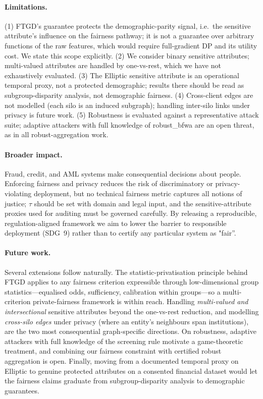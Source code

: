 \paragraph{Limitations.}
(1) FTGD's guarantee protects the demographic-parity signal, i.e.\ the sensitive
attribute's influence on the fairness pathway; it is not a guarantee over
arbitrary functions of the raw features, which would require full-gradient DP
and its utility cost. We state this scope explicitly. (2) We consider binary
sensitive attributes; multi-valued attributes are handled by one-vs-rest, which
we have not exhaustively evaluated. (3) The Elliptic sensitive attribute is an
operational temporal proxy, not a protected demographic; results there should be
read as subgroup-disparity analysis, not demographic fairness. (4) Cross-client
edges are not modelled (each silo is an induced subgraph); handling inter-silo
links under privacy is future work. (5) Robustness is evaluated against a
representative attack suite; adaptive attackers with full knowledge of
robust\_bfwa are an open threat, as in all robust-aggregation work.

\paragraph{Broader impact.}
Fraud, credit, and AML systems make consequential decisions about people.
Enforcing fairness and privacy reduces the risk of discriminatory or
privacy-violating deployment, but no technical fairness metric captures all
notions of justice; $\tau$ should be set with domain and legal input, and the
sensitive-attribute proxies used for auditing must be governed carefully. By
releasing a reproducible, regulation-aligned framework we aim to lower the
barrier to responsible deployment (SDG~9) rather than to certify any particular
system as "fair''.

\paragraph{Future work.}
Several extensions follow naturally. The statistic-privatisation principle
behind FTGD applies to any fairness criterion expressible through
low-dimensional group statistics---equalised odds, sufficiency, calibration
within groups---so a multi-criterion private-fairness framework is within reach.
Handling \emph{multi-valued and intersectional} sensitive attributes beyond the
one-vs-rest reduction, and modelling \emph{cross-silo edges} under privacy
(where an entity's neighbours span institutions), are the two most consequential
graph-specific directions. On robustness, adaptive attackers with full knowledge
of the screening rule motivate a game-theoretic treatment, and combining our
fairness constraint with certified robust aggregation is open. Finally, moving
from a documented temporal proxy on Elliptic to genuine protected attributes on
a consented financial dataset would let the fairness claims graduate from
subgroup-disparity analysis to demographic guarantees.

